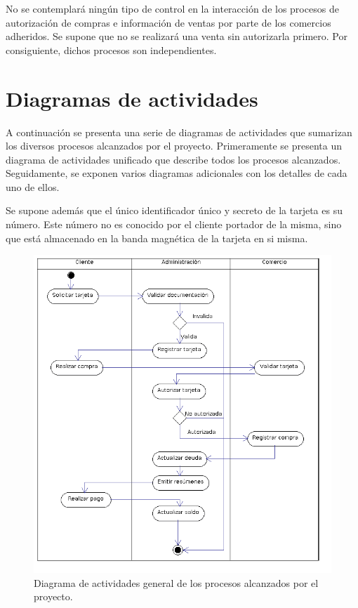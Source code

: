 No se contemplará ningún tipo de control en la interacción de los procesos de
autorización de compras e información de ventas por parte de los comercios
adheridos. Se supone que no se realizará una venta sin autorizarla primero. Por
consiguiente, dichos procesos son independientes.

\section{Diagramas de actividades}

A continuación se presenta una serie de diagramas de actividades que sumarizan
los diversos procesos alcanzados por el proyecto. Primeramente se presenta un
diagrama de actividades unificado que describe todos los procesos alcanzados.
Seguidamente, se exponen varios diagramas adicionales con los detalles de cada
uno de ellos.

Se supone además que el único identificador único y secreto de la tarjeta es su
número. Este número no es conocido por el cliente portador de la misma, sino
que está almacenado en la banda magnética de la tarjeta en si misma.

\begin{figure}[htb]
\begin{center}
\includegraphics[width=\textwidth]{images/mod_negocio_act_global.png}
\end{center}
\caption{Diagrama de actividades general de los procesos alcanzados por el
proyecto.}
\end{figure}

